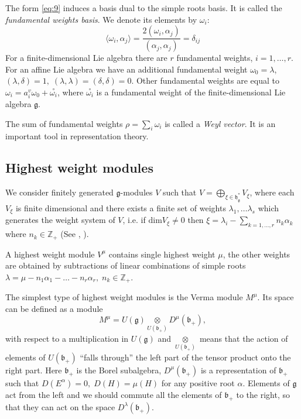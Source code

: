 \documentclass[preprint,12pt]{elsarticle}
\newcommand{\co}[1]{\stackrel{\circ }{#1}}
\newcommand{\gf}{\mathfrak{g}}
\newcommand{\bff}{\mathfrak{b}}
\newcommand{\hf}{\mathfrak{h}}
\newcommand{\hfg}{\hf_{\gf}}
\begin{document}
The form \eqref{eq:9} induces a basis dual  to the simple
roots basis. It is called the {\it fundamental weights basis}. We denote
its elements by $\omega_i$:
\begin{equation}
  \label{eq:20}
  \langle\omega_i,\alpha_j\rangle=\frac{2(\omega_{i},\alpha_{j})}{(\alpha_{j},\alpha_{j})}=\delta_{ij}
\end{equation}
For a finite-dimensional Lie algebra there are $r$ fundamental weights, $i=1,\dots, r$. For an affine Lie algebra we have an additional fundamental weight $\omega_0=\lambda$, $(\lambda,\delta)=1, \; (\lambda,\lambda)=(\delta,\delta)=0$. Other fundamental weights are equal to $\omega_i=a_i^v \omega_0 +\co{\omega_i}$, where $\co{\omega_i}$ is a fundamental weight of the finite-dimensional Lie algebra $\gf$.

 The sum of fundamental weights $\rho=\sum_{i} \omega_{i}$ is called a {\it Weyl vector}. It is an important tool in representation theory.

\subsection{Highest weight modules}
\label{sec:high-weight-modul}

We consider finitely generated $\gf$-modules $V$ such that $V=\bigoplus_{\xi\in \hfg^{*}} V_{\xi}$, where each $V_{\xi}$ is finite dimensional and there exists a finite set of weights $\lambda_{1},\dots \lambda_{s}$ which generates the weight system of $V$, i.e. if $\mathrm{dim}V_{\xi}\neq 0$ then $\xi=\lambda_{i}-\sum_{k=1,\dots, r} n_{k}\alpha_{k}$ where $n_{k}\in \mathbb{Z}_{+}$ (See \cite{humphreys2008representations}, \cite{carter2005lie}).

A highest weight module $V^{\mu}$ contains single highest weight $\mu$,  the other weights are obtained by subtractions of linear combinations of simple roots $\lambda=\mu-n_{1}\alpha_{1}-\dots-n_{r}\alpha_{r},\; n_{k}\in \mathbb{Z} _{+}$.

The simplest type of highest weight modules is the Verma module
$M^{\mu}$. Its space can be defined as a module
\begin{equation}
  \label{eq:17}
  M^{\mu}=U(\gf)\underset{U(\bff_{+})}{\otimes} D^{\mu}(\bff_{+}),
\end{equation}
with respect to a multiplication in $U(\gf)$ and
$\underset{U(\bff_{+})}{\otimes}$ means that the action of elements of $U(\bff_{+})$ ``falls through'' the left part of the tensor product onto the right part. Here $\bff_{+}$ is the Borel subalgebra, $D^{\mu}(\bff_{+})$ is a representation of $\bff_{+}$ such that $D(E^{\alpha})=0,\; D(H)=\mu(H)$ for any positive root $\alpha$.
Elements of $\gf$ act from the left and we should commute all the elements of $\bff_{+}$ to the right, so that they can act on the space $D^{\lambda}(\bff_{+})$.
\end{document}
